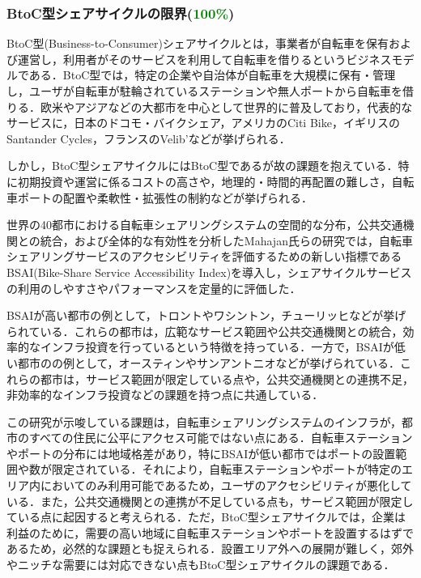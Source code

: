       \subsubsection{BtoC型シェアサイクルの限界(\textcolor{green}{100\%})}
        \label{sec:BtoC型シェアサイクルの限界}
          \par BtoC型(Business-to-Consumer)シェアサイクルとは，事業者が自転車を保有および運営し，利用者がそのサービスを利用して自転車を借りるというビジネスモデルである．BtoC型では，特定の企業や自治体が自転車を大規模に保有・管理し，ユーザが自転車が駐輪されているステーションや無人ポートから自転車を借りる．欧米やアジアなどの大都市を中心として世界的に普及しており，代表的なサービスに，日本のドコモ・バイクシェア，アメリカのCiti Bike，イギリスのSantander Cycles，フランスのVelib’などが挙げられる．
          \par しかし，BtoC型シェアサイクルにはBtoC型であるが故の課題を抱えている．特に初期投資や運営に係るコストの高さや，地理的・時間的再配置の難しさ，自転車ポートの配置や柔軟性・拡張性の制約などが挙げられる．
          \par 世界の40都市における自転車シェアリングシステムの空間的な分布，公共交通機関との統合，および全体的な有効性を分析したMahajan氏らの研究では，自転車シェアリングサービスのアクセシビリティを評価するための新しい指標であるBSAI(Bike-Share Service Accessibility Index)を導入し，シェアサイクルサービスの利用のしやすさやパフォーマンスを定量的に評価した．
          \par BSAIが高い都市の例として，トロントやワシントン，チューリッヒなどが挙げられている．これらの都市は，広範なサービス範囲や公共交通機関との統合，効率的なインフラ投資を行っているという特徴を持っている．一方で，BSAIが低い都市のの例として，オースティンやサンアントニオなどが挙げられている．これらの都市は，サービス範囲が限定している点や，公共交通機関との連携不足，非効率的なインフラ投資などの課題を持つ点に共通している．
          \par この研究が示唆している課題は，自転車シェアリングシステムのインフラが，都市のすべての住民に公平にアクセス可能ではない点にある．自転車ステーションやポートの分布には地域格差があり，特にBSAIが低い都市ではポートの設置範囲や数が限定されている．それにより，自転車ステーションやポートが特定のエリア内においてのみ利用可能であるため，ユーザのアクセシビリティが悪化している．また，公共交通機関との連携が不足している点も，サービス範囲が限定している点に起因すると考えられる．ただ，BtoC型シェアサイクルでは，企業は利益のために，需要の高い地域に自転車ステーションやポートを設置するはずであるため，必然的な課題とも捉えられる．設置エリア外への展開が難しく，郊外やニッチな需要には対応できない点もBtoC型シェアサイクルの課題である．
